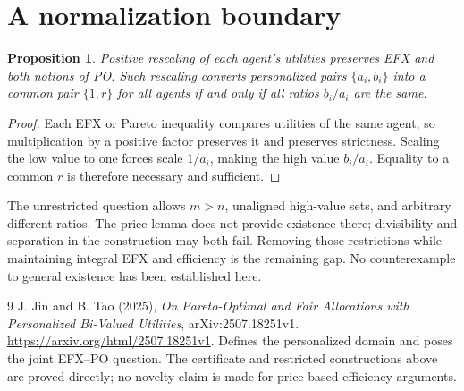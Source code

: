 \documentclass[11pt,a4paper]{article}
\newtheorem{proposition}[theorem]{Proposition}
\theoremstyle{definition}
\theoremstyle{remark}
\begin{document}
\section{A normalization boundary}
\begin{proposition}
Positive rescaling of each agent's utilities preserves EFX and both notions of PO. Such rescaling converts personalized pairs $\{a_i,b_i\}$ into a common pair $\{1,r\}$ for all agents if and only if all ratios $b_i/a_i$ are the same.
\end{proposition}
\begin{proof}
Each EFX or Pareto inequality compares utilities of the same agent, so multiplication by a positive factor preserves it and preserves strictness. Scaling the low value to one forces scale $1/a_i$, making the high value $b_i/a_i$. Equality to a common $r$ is therefore necessary and sufficient.
\end{proof}
The unrestricted question allows $m>n$, unaligned high-value sets, and arbitrary different ratios. The price lemma does not provide existence there; divisibility and separation in the construction may both fail. Removing those restrictions while maintaining integral EFX and efficiency is the remaining gap. No counterexample to general existence has been established here.
\begin{thebibliography}{9}
 J. Jin and B. Tao (2025), \emph{On Pareto-Optimal and Fair Allocations with Personalized Bi-Valued Utilities}, arXiv:2507.18251v1. \url{https://arxiv.org/html/2507.18251v1}. Defines the personalized domain and poses the joint EFX--PO question. The certificate and restricted constructions above are proved directly; no novelty claim is made for price-based efficiency arguments.
\end{thebibliography}
\end{document}
